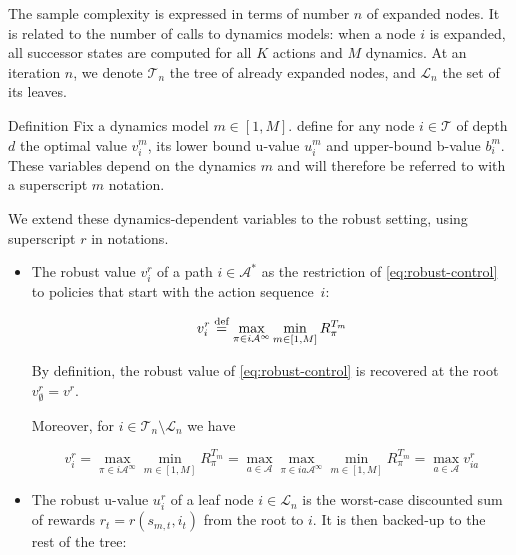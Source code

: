 \documentclass{article}
\newcommand{\eqdef}{\buildrel \text{def}\over =}
\begin{document}
\vspace{-1mm}
The sample complexity is expressed in terms of number $n$ of expanded nodes. It is related to the number of calls to dynamics models: when a node $i$ is expanded, all successor states are computed for all $K$ actions and $M$ dynamics. At an iteration $n$, we denote $\mathcal{T}_n$ the tree of already expanded nodes, and $\mathcal{L}_n$ the set of its leaves.

\vspace{-2mm}
\begin{paragraph}{Definition}
Fix a dynamics model $m\in[1, M]$. \citet{Hren2008} define for any node $i\in \mathcal{T}$ of depth $d$ the optimal value $v_i^m$, its lower bound u-value $u_i^m$ and upper-bound b-value $b_i^m$. These variables depend on the dynamics $m$ and will therefore be referred to with a superscript $m$ notation.

We extend these dynamics-dependent variables to the robust setting, using superscript $r$ in notations. 
\vspace{-1mm}
\begin{itemize}
\item The robust value $v^r_i$ of a path $i \in \mathcal{A}^*$ as the restriction of \eqref{eq:robust-control} to policies that start with the action sequence~$i$:

\vspace{-8mm}
\begin{equation}
v^r_i \eqdef \max_{\pi \in i\mathcal{A^\infty}} \min_{m\in[1, M]} R^{T_m}_\pi
\end{equation}

\vspace{-3mm}\noindent
By definition, the robust value of \eqref{eq:robust-control} is recovered at the root $v^r_\emptyset = v^r$.

\vspace{-1mm}
Moreover, for $i \in \mathcal{T}_n \setminus \mathcal{L}_n$ we have 

\vspace{-3mm}
\begin{equation}
\label{eq:max_vr}
v_i^r = \max_{\pi\in i\mathcal{A}^\infty} \min_{m \in [1, M]} R^{T_m}_\pi = \max_{a\in\mathcal{A}}\max_{\pi\in ia\mathcal{A}^\infty} \min_{m \in [1, M]} R^{T_m}_\pi = \max_{a\in\mathcal{A}}v_{ia}^r
\end{equation}

\vspace{-1mm}
\item The robust u-value $u_i^r$ of a leaf node $i \in \mathcal{L}_n$ is the worst-case discounted sum of rewards $r_t=r(s_{m,t},i_t)$ from the root to $i$. It is then backed-up to the rest of the tree:


\end{itemize}
\end{paragraph}
\end{document}

